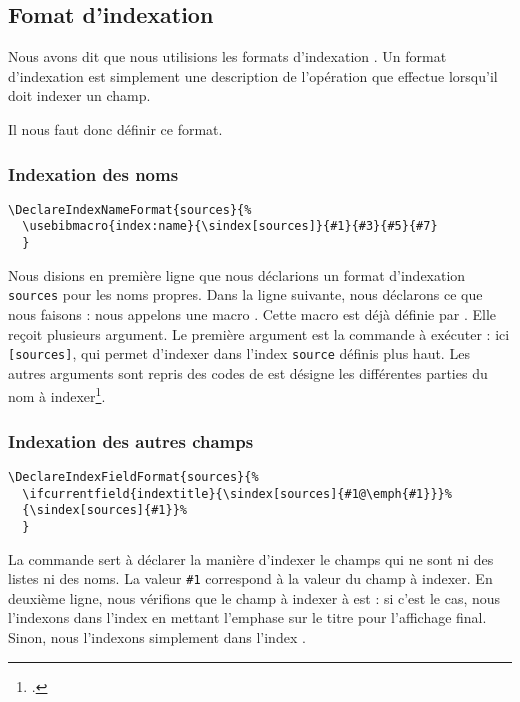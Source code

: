 \subsection{Fomat d'indexation }

Nous avons dit que nous utilisions les formats d'indexation . Un format d'indexation   est simplement une description de l'opération que  effectue lorsqu'il doit indexer un champ. 

Il nous faut donc définir ce format. 

\subsubsection{Indexation des noms}

\begin{verbatim}
\DeclareIndexNameFormat{sources}{%
  \usebibmacro{index:name}{\sindex[sources]}{#1}{#3}{#5}{#7}
  }
\end{verbatim}

Nous disions en première ligne que nous déclarions un format d'indexation \verb|sources| pour les noms propres. Dans la ligne suivante, nous déclarons ce que nous faisons : nous appelons une macro . Cette macro est déjà définie par . Elle reçoit plusieurs argument. Le première argument est la commande à exécuter : ici \verb|[sources]|, qui permet d'indexer dans l'index \verb|source| définis plus haut. Les autres arguments sont repris des codes de  est désigne les différentes parties du nom à indexer\footcite[Nous renvoyons le lecteur à la documentation de  : ][]{biblatex_formats}.


\subsubsection{Indexation des autres champs}

\begin{verbatim}
\DeclareIndexFieldFormat{sources}{%
  \ifcurrentfield{indextitle}{\sindex[sources]{#1@\emph{#1}}}%
  {\sindex[sources]{#1}}%
  }
\end{verbatim}

La commande  sert à déclarer la manière d'indexer le champs qui ne sont ni des listes ni des noms. La valeur \verb|#1| correspond à la valeur du champ à indexer. En deuxième ligne, nous vérifions que le champ à indexer à est  : si c'est le cas, nous l'indexons dans l'index  en mettant l'emphase sur le titre pour l'affichage final. Sinon, nous l'indexons simplement dans l'index .

